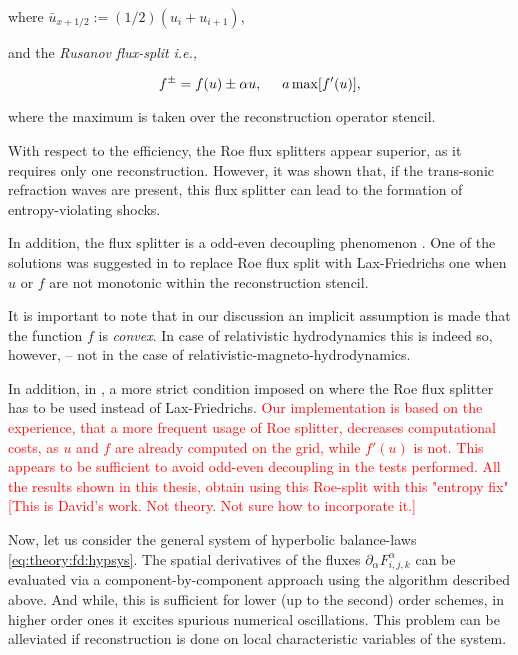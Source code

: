 where $\bar{u}_{x+1/2} := (1/2) (u_i + u_{i+1})$, 

and the \textit{Rusanov flux-split} \cite{Shu:1997} \textit{i.e.,}

\begin{equation}
f^{\pm} = f(u) \pm \alpha u, \hspace{5mm} a \max[f'(u)],
\label{eq:theory:fd:laxfluxsplit}
\end{equation}

where the maximum is taken over the reconstruction operator stencil. 

With respect to the efficiency, the Roe flux splitters appear superior, as it requires only one reconstruction. However, it was shown \cite{LeVeque:1992} that, if the trans-sonic refraction waves  are present, this flux splitter can lead to the formation of entropy-violating shocks. 

In addition, the flux splitter is a odd-even decoupling phenomenon \cite{Quirk:1994}. One of the solutions was suggested in \cite{Radice:2012cu} to replace Roe flux split with Lax-Friedrichs one when $u$ or $f$ are not monotonic within the reconstruction stencil. 

It is important to note that in our discussion an implicit assumption is made that the function $f$ is \textit{convex}. In case of relativistic hydrodynamics this is indeed so, however, -- not in the case of relativistic-magneto-hydrodynamics. 

In addition, in \cite{LeVeque:1992}, a more strict condition imposed on where the Roe flux splitter has to be used instead of Lax-Friedrichs. 
\textcolor{red}{Our implementation is based on the experience, that a more frequent usage of Roe splitter, decreases computational costs, as $u$ and $f$ are already computed on the grid, while $f'(u)$ is not. This appears to be sufficient to avoid odd-even decoupling in the tests performed. All the results shown in this thesis, obtain using this Roe-split with this "entropy fix" [This is David's work. Not theory. Not sure how to incorporate it.]} 

Now, let us consider the general system of hyperbolic balance-laws \ref{eq:theory:fd:hypsys}. 
The spatial derivatives of the fluxes $\partial_{\alpha} F_{i,j,k} ^{\alpha}$ can be evaluated via a component-by-component approach using the algorithm described above. And while, this is sufficient for lower (up to the second) order schemes, in higher order ones it excites spurious numerical oscillations.
This problem can be alleviated if reconstruction is done on local characteristic variables of the system. 

